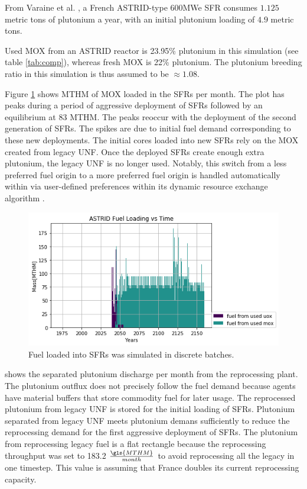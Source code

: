 From Varaine et al. \cite{varaine_pre-conceptual_2012}, a French
ASTRID-type 600\gls{MWe} \gls{SFR} consumes $1.125$ metric tons of
plutonium a year, with an initial plutonium loading of $4.9$ metric tons.

 Used \gls{MOX} from an ASTRID reactor is 23.95\% plutonium
in this simulation (see table \ref{tab:comp}), whereas fresh \gls{MOX} is 22\% plutonium.
The plutonium breeding ratio in this simulation is thus assumed to be
$\approx 1.08$.

Figure \ref{fig:fuel} shows MTHM of \gls{MOX} loaded in the \glspl{SFR} per month.  The plot 
has peaks during a period of aggressive deployment of \glspl{SFR} followed by 
an equilibrium at 83 \gls{MTHM}. The peaks reoccur with the deployment of the 
second generation of \glspl{SFR}.  The spikes are due to initial fuel demand 
corresponding to these new deployments.  The initial cores loaded into new 
\glspl{SFR} rely on the \gls{MOX} created from legacy \gls{UNF}. Once the 
deployed \glspl{SFR} create enough extra plutonium, the legacy \gls{UNF} is no 
longer used. Notably, this switch from a less preferred fuel origin to a more 
preferred fuel origin is handled automatically within \Cyclus via user-defined preferences 
within its dynamic resource exchange algorithm \cite{gidden_methodology_2016}.


\begin{figure}[htbp!]
    \begin{center}
        \includegraphics[scale=0.7]{./images/french-transition/where_fuel.png}
    \end{center}
    \caption{Fuel loaded into \glspl{SFR} was simulated in discrete 
        batches.}
    \label{fig:fuel}
\end{figure}

 shows the separated plutonium discharge per month from the reprocessing plant.
The plutonium outflux does not precisely follow the fuel demand because \Cyclus agents have material
buffers that store commodity fuel for later usage. The reprocessed plutonium from legacy \gls{UNF} is
stored for the initial loading of \glspl{SFR}.  Plutonium separated from legacy \gls{UNF} meets
plutonium demans sufficiently to reduce the reprocessing demand for the first aggressive deployment
of \glspl{SFR}.  The plutonium from reprocessing legacy fuel is a flat rectangle because the reprocessing
throughput was set to 183.2 $\frac{\gls{MTHM}}{month}$ to avoid reprocessing all the legacy in one timestep.
This value is assuming that France doubles its current reprocessing capacity.
 

